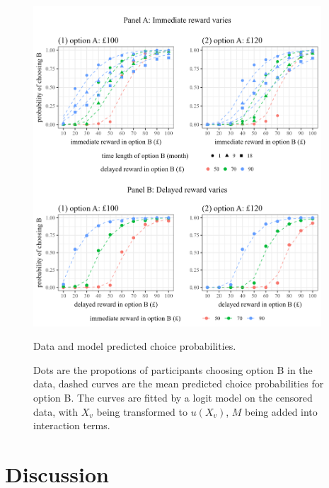 \documentclass[
  12pt,
]{article}
\begin{document}
\begin{figure}
  \centering
  \includegraphics[width=0.96\textwidth]{figures/fig_grand_pred.png}
  \caption{Data and model predicted choice probabilities.}
  \caption*{\small Dots are the propotions of participants choosing option B in the data, dashed curves are the mean predicted choice probabilities for option B. The curves are fitted by a logit model on the censored data, with $X_v$ being transformed to $u(X_v)$, $M$ being added into interaction terms.}
  \label{fig:choice-predicted}
\end{figure}

\hypertarget{discussion}{%
\section{Discussion}\label{discussion}}
\end{document}
